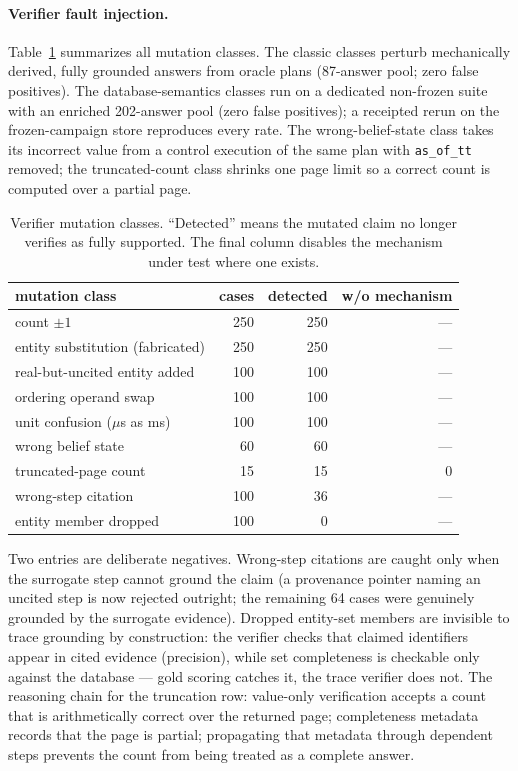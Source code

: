 \documentclass[11pt]{article}
\begin{document}
\paragraph{Verifier fault injection.}
Table~\ref{tab:mutations} summarizes all mutation classes. The classic
classes perturb mechanically derived, fully grounded answers from
oracle plans (87-answer pool; zero false positives). The
database-semantics classes run on a dedicated non-frozen suite with an
enriched 202-answer pool (zero false positives); a receipted rerun on
the frozen-campaign store reproduces every rate. The wrong-belief-state
class takes its incorrect value from a control execution of the same
plan with \texttt{as\_of\_tt} removed; the truncated-count class
shrinks one page limit so a correct count is computed over a partial
page.

\begin{table}[t]
\centering\small
\caption{Verifier mutation classes. ``Detected'' means the mutated
claim no longer verifies as fully supported. The final column disables
the mechanism under test where one exists.}
\label{tab:mutations}
\begin{tabular}{lrrr}
\toprule
mutation class & cases & detected & w/o mechanism \\
\midrule
count $\pm 1$ & 250 & 250 & --- \\
entity substitution (fabricated) & 250 & 250 & --- \\
real-but-uncited entity added & 100 & 100 & --- \\
ordering operand swap & 100 & 100 & --- \\
unit confusion ($\mu$s as ms) & 100 & 100 & --- \\
wrong belief state & 60 & 60 & --- \\
truncated-page count & 15 & 15 & 0 \\
wrong-step citation & 100 & 36 & --- \\
entity member dropped & 100 & 0 & --- \\
\bottomrule
\end{tabular}
\end{table}

Two entries are deliberate negatives. Wrong-step citations are caught
only when the surrogate step cannot ground the claim (a provenance
pointer naming an uncited step is now rejected outright; the remaining
64 cases were genuinely grounded by the surrogate evidence). Dropped
entity-set members are invisible to trace grounding by construction:
the verifier checks that claimed identifiers appear in cited evidence
(precision), while set completeness is checkable only against the
database --- gold scoring catches it, the trace verifier does not.
The reasoning chain for the truncation row: value-only verification
accepts a count that is arithmetically correct over the returned page;
completeness metadata records that the page is partial; propagating
that metadata through dependent steps prevents the count from being
treated as a complete answer.
\end{document}
